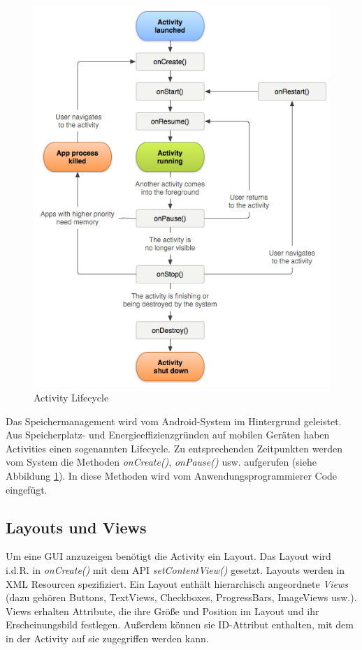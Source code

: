 \begin{figure}[ht]
\centering
\includegraphics[width=\textwidth]{../img/ActivityLifecycle.png}
\caption{Activity Lifecycle}
\label{fig:activitylifecycle}
\end{figure}

Das Speichermanagement wird vom Android-System im Hintergrund geleistet. Aus Speicherplatz- und Energieeffizienzgründen auf mobilen Geräten haben Activities einen sogenannten Lifecycle. Zu entsprechenden Zeitpunkten werden vom System die Methoden \emph{onCreate()}, \emph{onPause()} usw. aufgerufen (siehe Abbildung \ref{fig:activitylifecycle}). In diese Methoden wird vom Anwendungsprogrammierer Code eingefügt.

\subsection{Layouts und Views}

Um eine GUI anzuzeigen benötigt die Activity ein Layout. Das Layout wird i.d.R. in \emph{onCreate()} mit dem API \emph{setContentView()} gesetzt. Layouts werden in XML Resourcen spezifiziert. Ein Layout enthält hierarchisch angeordnete \emph{Views} (dazu gehören Buttons, TextViews, Checkboxes, ProgressBars, ImageViews usw.). Views erhalten Attribute, die ihre Größe und Position im Layout und ihr Erscheinungsbild festlegen. Außerdem können sie ID-Attribut enthalten, mit dem in der Activity auf sie zugegriffen werden kann.

